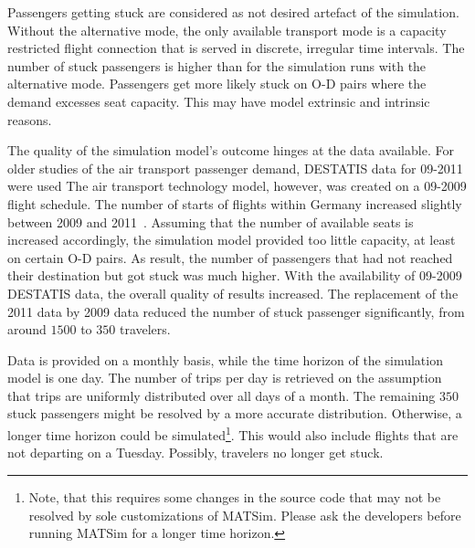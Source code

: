 %
Passengers getting stuck are considered as not desired artefact of the simulation. 
Without the alternative mode, the only available transport mode is a capacity restricted flight connection that is served in discrete, irregular time intervals. 
The number of stuck passengers is higher than for the simulation runs with the alternative mode. 
Passengers get more likely stuck on O-D pairs where the demand excesses seat capacity. 
This may have model extrinsic and intrinsic reasons. 

The quality of the simulation model's outcome hinges at the data available.  
For older studies of the air transport passenger demand, DESTATIS data for 09-2011 were used
The air transport technology model, however, was created on a 09-2009 flight schedule.  
The number of starts of flights within Germany increased slightly between 2009 and 2011~\citep[][p.~23]{DLR2011Luftverkehrsbericht}. 
Assuming that the number of available seats is increased accordingly, the simulation model provided too little capacity, at least on certain O-D pairs. 
As result, the number of passengers that had not reached their destination but got stuck was much higher. 
With the availability of 09-2009 DESTATIS data, the overall quality of results increased.  
The replacement of the 2011 data by 2009 data reduced the number of stuck passenger significantly, from around $1500$ to $350$ travelers. 

Data is provided on a monthly basis, while the time horizon of the simulation model is one day. 
The number of trips per day is retrieved on the assumption that trips are uniformly distributed over all days of a month.  
The remaining $350$ stuck passengers might be resolved by a more accurate distribution. 
Otherwise, a longer time horizon could be simulated\footnote{Note, that this requires some changes in the source code that may not be resolved by sole customizations of MATSim. Please ask the developers before running MATSim for a longer time horizon.}. 
This would also include flights that are not departing on a Tuesday. 
Possibly, travelers no longer get stuck. 

